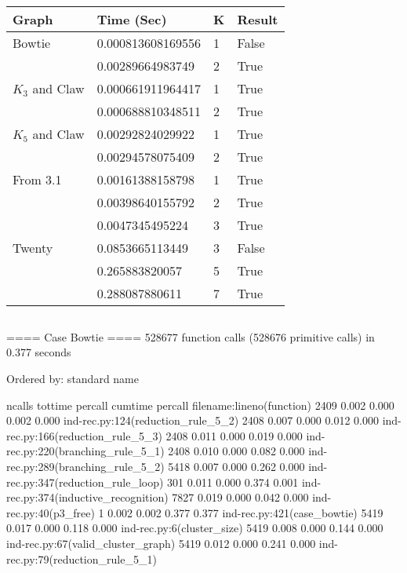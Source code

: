 \documentclass[11pt]{article}
\begin{document}
\subsection{}
\label{subsec:results} %
\begin{center}
    \begin{tabu} to 0.8\textwidth { | X[l] X[l] X[c] X[c] | }
        \hline
        Graph & Time (Sec) & K & Result \\
        [0.5ex]
        \hline
        \hline
Bowtie & 0.000813608169556 & 1 & False \\
[0.3ex]
  & 0.00289664983749 & 2 & True \\
[0.3ex]
\hline
$K_3$ and Claw & 0.000661911964417 & 1 & True \\
[0.3ex]
 & 0.000688810348511 & 2 & True \\
[0.3ex]
\hline
$K_5$ and Claw & 0.00292824029922 & 1 & True \\
[0.3ex]
 & 0.00294578075409 & 2 & True \\
[0.3ex]
\hline
From 3.1 & 0.00161388158798 & 1 & True \\
[0.3ex]
 & 0.00398640155792 & 2 & True \\
[0.3ex]
 & 0.0047345495224 & 3 & True \\
[0.3ex]
\hline
Twenty & 0.0853665113449 & 3 & False \\
[0.3ex]
  & 0.265883820057 & 5 & True \\
[0.3ex]
 & 0.288087880611 & 7 & True \\
[0.3ex]
\hline
\end{tabu}
\end{center}

\subsection{}
\label{subsec:results} %

==== Case Bowtie ====
    528677 function calls (528676 primitive calls) in 0.377 seconds

   Ordered by: standard name

   ncalls  tottime  percall  cumtime  percall filename:lineno(function)
     2409    0.002    0.000    0.002    0.000 ind-rec.py:124(reduction_rule_5_2)
     2408    0.007    0.000    0.012    0.000 ind-rec.py:166(reduction_rule_5_3)
     2408    0.011    0.000    0.019    0.000 ind-rec.py:220(branching_rule_5_1)
     2408    0.010    0.000    0.082    0.000 ind-rec.py:289(branching_rule_5_2)
     5418    0.007    0.000    0.262    0.000 ind-rec.py:347(reduction_rule_loop)
      301    0.011    0.000    0.374    0.001 ind-rec.py:374(inductive_recognition)
     7827    0.019    0.000    0.042    0.000 ind-rec.py:40(p3_free)
        1    0.002    0.002    0.377    0.377 ind-rec.py:421(case_bowtie)
     5419    0.017    0.000    0.118    0.000 ind-rec.py:6(cluster_size)
     5419    0.008    0.000    0.144    0.000 ind-rec.py:67(valid_cluster_graph)
     5419    0.012    0.000    0.241    0.000 ind-rec.py:79(reduction_rule_5_1)
\end{document}
